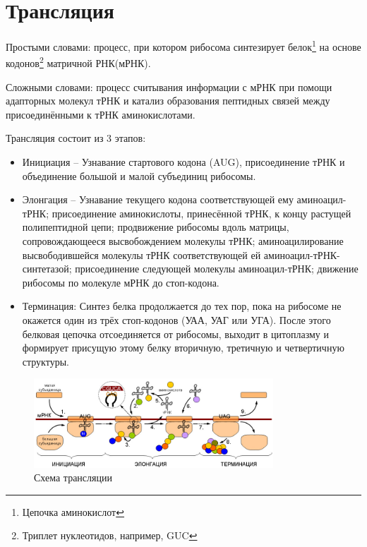 \section{Трансляция}

Простыми словами: процесс, при котором рибосома синтезирует белок\footnote{Цепочка аминокислот} на основе кодонов\footnote{Триплет нуклеотидов, например, GUC} матричной РНК(мРНК). 

Сложными словами: процесс считывания информации с мРНК при помощи адапторных молекул тРНК и катализ образования пептидных связей между присоединёнными к тРНК аминокислотами.

 


Трансляция состоит из 3 этапов: 

\begin{itemize}
    \item Инициация -- Узнавание стартового кодона (AUG), присоединение тРНК и объединение большой и малой субъединиц рибосомы.
    \item Элонгация -- Узнавание текущего кодона соответствующей ему аминоацил-тРНК; присоединение аминокислоты, принесённой тРНК, к концу растущей полипептидной цепи; продвижение рибосомы вдоль матрицы, сопровождающееся высвобождением молекулы тРНК; 
    аминоацилирование высвободившейся молекулы тРНК соответствующей ей аминоацил-тРНК-синтетазой;  присоединение следующей молекулы аминоацил-тРНК; движение рибосомы по молекуле мРНК до стоп-кодона.
    \item Терминация: Синтез белка продолжается до тех пор, пока на рибосоме не окажется один из трёх стоп-кодонов (УАА, УАГ или УГА). После этого белковая цепочка отсоединяется от рибосомы, выходит в цитоплазму и формирует присущую этому белку вторичную, третичную и четвертичную структуры.
\end{itemize}

\begin{figure}[h]
    \centering
    \includegraphics[width=0.8\textwidth]{Pictures/5_3(translation_e).jpg}
    \caption{Схема трансляции}
    \label{fig:5_3(translation_e)}
\end{figure}


